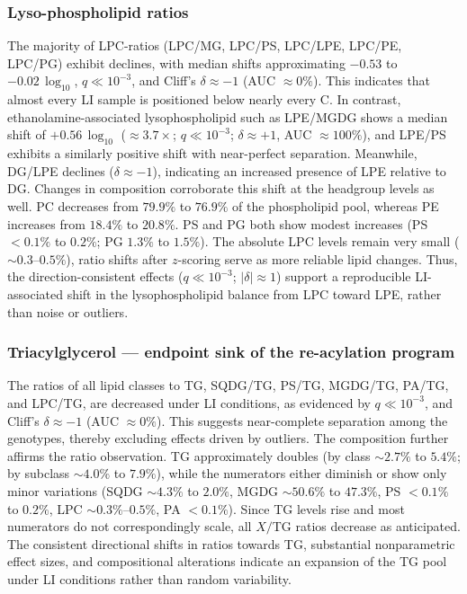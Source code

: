 \documentclass[10pt,letterpaper]{article}
\begin{document}
\begin{itemize}
\subsubsection*{Lyso-phospholipid ratios}
The majority of LPC-ratios (LPC/MG, LPC/PS, LPC/LPE, LPC/PE, LPC/PG) exhibit declines, with median shifts approximating $-0.53$ to $-0.02 \,\log_{10}$, $q \ll 10^{-3}$, and Cliff’s $\delta \approx -1$ (AUC $\approx 0\%$). This indicates that almost every LI sample is positioned below nearly every C. In contrast, ethanolamine-associated lysophospholipid such as LPE/MGDG shows a median shift of  $+0.56 \,\log_{10}$ ($\approx 3.7\times$; $q \ll 10^{-3}$; $\delta \approx +1$, AUC $\approx 100\%$), and LPE/PS exhibits a similarly positive shift with near-perfect separation. Meanwhile, DG/LPE declines ($\delta \approx -1$), indicating an increased presence of LPE relative to DG. Changes in composition corroborate this shift at the headgroup levels as well. PC decreases from $79.9\%$ to $76.9\%$ of the phospholipid pool, whereas PE increases from $18.4\%$ to $20.8\%$. PS and PG both show modest increases (PS $<0.1\% $ to $ 0.2\%$; PG $1.3\% $ to $ 1.5\%$). The absolute LPC levels remain very small ($\sim 0.3$–$0.5\%$), ratio shifts after $z$-scoring serve as more reliable lipid changes. Thus, the direction-consistent effects ($q \ll 10^{-3}$; $|\delta| \approx 1$) support a reproducible LI-associated shift in the lysophospholipid balance from LPC toward LPE, rather than noise or outliers.

\subsubsection*{Triacylglycerol — endpoint sink of the re-acylation program}
The ratios of all lipid classes to TG, SQDG/TG, PS/TG, MGDG/TG, PA/TG, and LPC/TG, are decreased under LI conditions, as evidenced by $q \ll 10^{-3}$, and Cliff's $\delta \approx -1$ (AUC $\approx 0\%$). This suggests near-complete separation among the genotypes, thereby excluding effects driven by outliers. The composition further affirms the ratio observation. TG approximately doubles (by class $\sim 2.7\% $ to $ 5.4\%$; by subclass $\sim 4.0\% $ to $ 7.9\%$), while the numerators either diminish or show only minor variations (SQDG $\sim 4.3\% $ to $ 2.0\%$, MGDG $\sim 50.6\% $ to $ 47.3\%$, PS $<0.1\% $ to $ 0.2\%$, LPC $\sim 0.3\%$–$0.5\%$, PA $<0.1\%$). Since TG levels rise and most numerators do not correspondingly scale, all $X/$TG ratios decrease as anticipated. The consistent directional shifts in ratios towards TG, substantial nonparametric effect sizes, and compositional alterations indicate an expansion of the TG pool under LI conditions rather than random variability.



\end{itemize}
\end{document}
